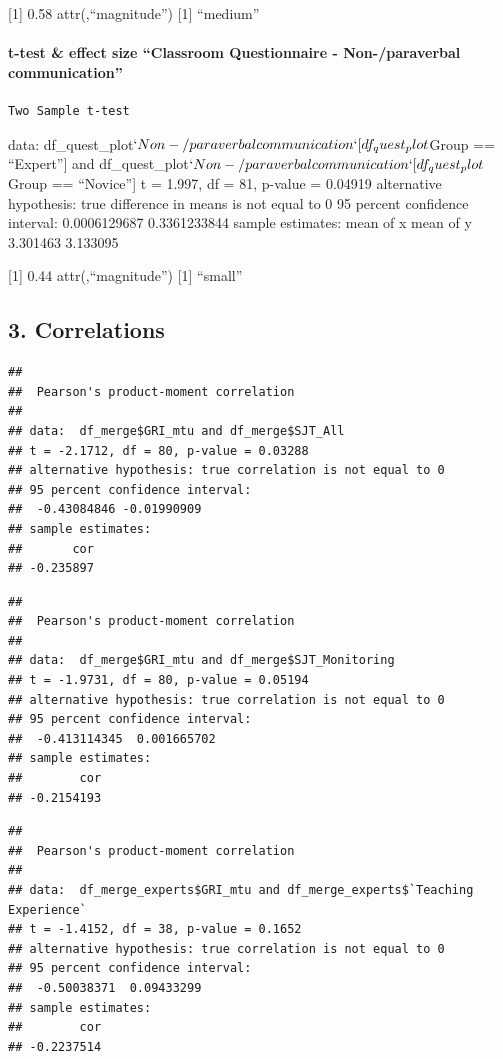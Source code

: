 \documentclass[
]{article}
\begin{document}
{[}1{]} 0.58 attr(,``magnitude'') {[}1{]} ``medium''

\paragraph{t-test \& effect size ``Classroom Questionnaire -
Non-/paraverbal
communication''}\label{t-test-effect-size-classroom-questionnaire---non-paraverbal-communication}

\begin{verbatim}
Two Sample t-test
\end{verbatim}

data:
df\_quest\_plot\(`Non-/paraverbal communication`[df_quest_plot\)Group ==
``Expert''{]} and
df\_quest\_plot\(`Non-/paraverbal communication`[df_quest_plot\)Group ==
``Novice''{]} t = 1.997, df = 81, p-value = 0.04919 alternative
hypothesis: true difference in means is not equal to 0 95 percent
confidence interval: 0.0006129687 0.3361233844 sample estimates: mean of
x mean of y 3.301463 3.133095

{[}1{]} 0.44 attr(,``magnitude'') {[}1{]} ``small''

\subsection{3. Correlations}\label{correlations}

\begin{verbatim}
## 
##  Pearson's product-moment correlation
## 
## data:  df_merge$GRI_mtu and df_merge$SJT_All
## t = -2.1712, df = 80, p-value = 0.03288
## alternative hypothesis: true correlation is not equal to 0
## 95 percent confidence interval:
##  -0.43084846 -0.01990909
## sample estimates:
##       cor 
## -0.235897
\end{verbatim}

\begin{verbatim}
## 
##  Pearson's product-moment correlation
## 
## data:  df_merge$GRI_mtu and df_merge$SJT_Monitoring
## t = -1.9731, df = 80, p-value = 0.05194
## alternative hypothesis: true correlation is not equal to 0
## 95 percent confidence interval:
##  -0.413114345  0.001665702
## sample estimates:
##        cor 
## -0.2154193
\end{verbatim}

\begin{verbatim}
## 
##  Pearson's product-moment correlation
## 
## data:  df_merge_experts$GRI_mtu and df_merge_experts$`Teaching Experience`
## t = -1.4152, df = 38, p-value = 0.1652
## alternative hypothesis: true correlation is not equal to 0
## 95 percent confidence interval:
##  -0.50038371  0.09433299
## sample estimates:
##        cor 
## -0.2237514
\end{verbatim}
\end{document}
